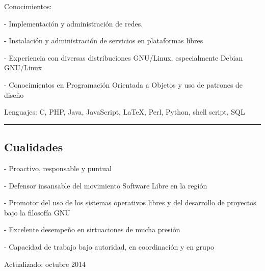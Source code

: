 \documentclass[10pt,letterpaper]{article}
\newenvironment{indentsection}[1]%
{\begin{list}{}%
	{\setlength{\leftmargin}{#1}}%
	\item[]%
}
{\end{list}}
\begin{document}
\begin{indentsection}{\parindent}
\begin{description*}
  \item[Conocimientos:]
  \item - Implementación y administración de redes.
	\item - Instalación y administración de servicios en plataformas libres
	\item - Experiencia con diversas distribuciones GNU/Linux, especialmente Debian GNU/Linux
	\item - Conocimientos en Programación Orientada a Objetos y uso de patrones de diseño
	\item[Lenguajes:]
	C, PHP, Java, JavaScript, \LaTeX, Perl, Python, shell script, SQL
\end{description*}
\end{indentsection}

\hrule
\vspace{-0.4em}
\subsection*{Cualidades}

\begin{indentsection}{\parindent}
\begin{description*}
	\item - Proactivo, responsable y puntual
	\item - Defensor insansable del movimiento Software Libre en la región
  \item - Promotor del uso de los sistemas operativos libres y del desarrollo de proyectos bajo la
  filosofía GNU
  \item - Excelente desempeño en sirtuaciones de mucha presión
  \item - Capacidad de trabajo bajo autoridad, en coordinación y en grupo	
\end{description*}
\end{indentsection}

\begin{center}
  {\small {\footnotesize Actualizado: octubre 2014}}
\end{center}
\end{document}
